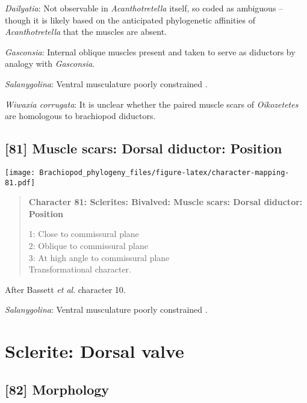 \documentclass[openany]{book}
\theoremstyle{definition}
\theoremstyle{definition}
\theoremstyle{definition}
\theoremstyle{remark}
\begin{document}
\hypertarget{Dailyatia-coding-80}{}
\emph{Dailyatia}: Not observable in \emph{Acanthotretella} itself, so
coded as ambiguous -- though it is likely based on the anticipated
phylogenetic affinities of \emph{Acanthotretella} that the muscles are
absent.

\hypertarget{Gasconsia-coding-80}{}
\emph{Gasconsia}: Internal oblique muscles present \citep{Nikitin1984}
and taken to serve as diductors by analogy with \emph{Gasconsia}.

\hypertarget{Salanygolina-coding-80}{}
\emph{Salanygolina}: Ventral musculature poorly constrained
\citep{Williams2000LinguliformeaCraniiformea, Popov2009Earlyontogeny}.

\hypertarget{Wiwaxia_corrugata-coding-80}{}
\emph{Wiwaxia corrugata}: It is unclear whether the paired muscle scars
of \emph{Oikozetetes} are homologous to brachiopod diductors.

\subsection*{{[}81{]} Muscle scars: Dorsal diductor:
Position}\label{muscle-scars-dorsal-diductor-position}

\texttt{[image: Brachiopod\_phylogeny\_files/figure-latex/character-mapping-81.pdf]}

\begin{quote}
\textbf{Character 81: Sclerites: Bivalved: Muscle scars: Dorsal
diductor: Position}

1: Close to commissural plane\\
2: Oblique to commissural plane\\
3: At high angle to commissural plane\\
Transformational character.
\end{quote}

After Bassett \emph{et al}.
\citeyearpar{Bassett2001Functionalmorphology} character 10.

\hypertarget{Salanygolina-coding-81}{}
\emph{Salanygolina}: Ventral musculature poorly constrained
\citep{Williams2000LinguliformeaCraniiformea, Popov2009Earlyontogeny}.

\section{Sclerite: Dorsal valve}\label{sclerite-dorsal-valve}

\subsection*{{[}82{]} Morphology}\label{morphology-2}
\end{document}
